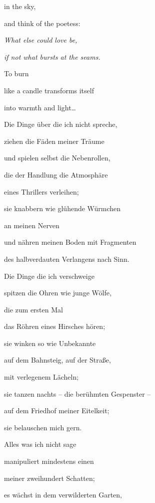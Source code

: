 in the sky,


\bigskip

and think of the poetess:

\emph{
What else could love be,}

\emph{
if not what bursts at the seams.}


\bigskip

To burn

like a candle transforms itself

into warmth and light…


\bigskip


\bigskip



\bigskip


\bigskip

Die Dinge über die ich nicht spreche, 

ziehen die Fäden meiner Träume

und spielen selbst die Nebenrollen,

die der Handlung die Atmosphäre

eines Thrillers verleihen;

sie knabbern wie glühende Würmchen 

an meinen Nerven

und nähren meinen Boden mit Fragmenten

des halbverdauten Verlangens nach Sinn.


\bigskip

Die Dinge die ich verschweige

spitzen die Ohren wie junge Wölfe,

die zum ersten Mal 

das Röhren eines Hirsches hören;

sie winken so wie Unbekannte

auf dem Bahnsteig, auf der Straße, 

mit verlegenem Lächeln;

sie tanzen nachts -- die berühmten Gespenster --

auf dem Friedhof meiner Eitelkeit;

sie belauschen mich gern.


\bigskip

Alles was ich nicht sage

manipuliert mindestens einen

meiner zweihundert Schatten;

es wächst in dem verwilderten Garten,

